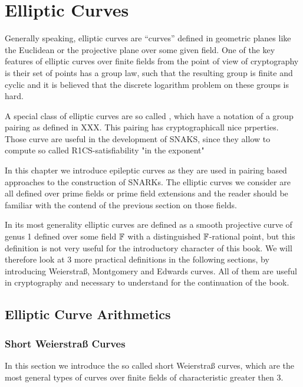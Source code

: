\chapter{Elliptic Curves}

Generally speaking, elliptic curves are ``curves'' defined in geometric planes like the Euclidean or the projective plane over some given field. One of the key features of elliptic curves over finite fields from the point of view of cryptography is their set of points has a group law, such that the resulting group is finite and cyclic and it is believed that the discrete logarithm problem on these groups is hard. 

A special class of elliptic curves are so called , which have a notation of a group pairing as defined in XXX. This pairing has cryptographicall nice prperties. Those curve are useful in the development of SNAKS, since they allow to compute so called R1CS-satisfiability "in the exponent" 

In this chapter we introduce epileptic curves as they are used in pairing based approaches to the construction of SNARKs. The elliptic curves we consider are all defined over prime fields or prime field extensions and the reader should be familiar with the contend of the previous section on those fields.

In its most generality elliptic curves are defined as a smooth projective curve of genus 1 defined over some field $\mathbb{F}$ with a distinguished $\mathbb{F}$-rational point, but this definition is not very useful for the introductory character of this book. We will therefore look at $3$ more practical definitions in the following sections, by introducing Weierstraß, Montgomery and Edwards curves. All of them are useful in cryptography and necessary to understand for the continuation of the book.

\section{Elliptic Curve Arithmetics}

\subsection{Short Weierstraß Curves}
In this section we introduce the so called short Weierstraß curves, which are the most general types of curves over finite fields of characteristic greater then $3$. 

